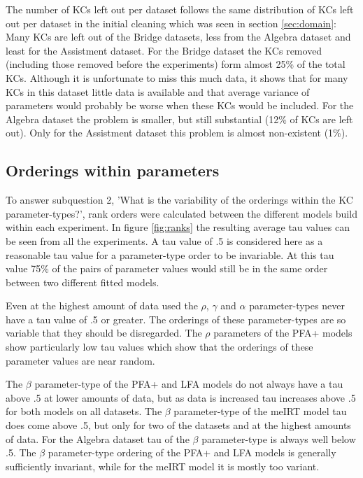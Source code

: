 \documentclass{scrartcl}
\begin{document}
The number of KCs left out per dataset follows the same distribution of KCs left out per dataset in the initial cleaning which was seen in section \ref{sec:domain}: Many KCs are left out of the Bridge datasets, less from the Algebra dataset and least for the Assistment dataset. For the Bridge dataset the KCs removed (including those removed before the experiments) form almost 25\% of the total KCs. Although it is unfortunate to miss this much data, it shows that for many KCs in this dataset little data is available and that average variance of parameters would probably be worse when these KCs would be included. For the Algebra dataset the problem is smaller, but still substantial (12\% of KCs are left out). Only for the Assistment dataset this problem is almost non-existent (1\%).

\subsection{Orderings within parameters}
\label{sec:rankresults}
To answer subquestion 2, 'What is the variability of the orderings within the KC parameter-types?', rank orders were calculated between the different models build within each experiment. In figure \ref{fig:ranks} the resulting average tau values can be seen from all the experiments. A tau value of .5 is considered here as a reasonable tau value for a parameter-type order to be invariable. At this tau value 75\% of the pairs of parameter values would still be in the same order between two different fitted models.

Even at the highest amount of data used the $\rho$, $\gamma$ and $\alpha$ parameter-types never have a tau value of .5 or greater. The orderings of these parameter-types are so variable that they should be disregarded. The $\rho$ parameters of the PFA+ models show particularly low tau values which show that the orderings of these parameter values are near random.

The $\beta$ parameter-type of the PFA+ and LFA models do not always have a tau above .5 at lower amounts of data, but as data is increased tau increases above .5 for both models on all datasets. The $\beta$ parameter-type of the meIRT model tau does come above .5, but only for two of the datasets and at the highest amounts of data. For the Algebra dataset tau of the $\beta$ parameter-type is always well below .5. The $\beta$ parameter-type ordering of the PFA+ and LFA models is generally sufficiently invariant, while for the meIRT model it is mostly too variant.
\end{document}
